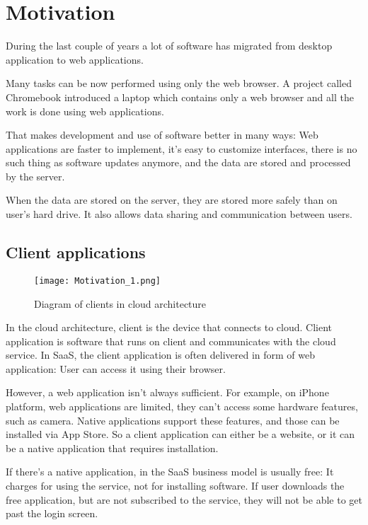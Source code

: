 \section{Motivation}

During the last couple of years a lot of software has migrated from desktop application to web applications.

Many tasks can be now performed using only the web browser. A project called Chromebook \citep{chromebook} introduced a laptop which contains only a web browser and all the work is done using web applications.

That makes development and use of software better in many ways: Web applications are faster to implement, it’s easy to customize interfaces, there is no such thing as software updates anymore, and the data are stored and processed by the server.

When the data are stored on the server, they are stored more safely than on user's hard drive. It also allows data sharing and communication between users.

\subsection{Client applications}

\begin{figure}[ht!]
\centering
\texttt{[image: Motivation\_1.png]}
\caption{Diagram of clients in cloud architecture \label{fig:1}}
\end{figure}

In the cloud architecture, client is the device that connects to cloud. Client application is software that runs on client and communicates with the cloud service. In SaaS, the client application is often delivered in form of web application: User can access it using their browser.

However, a web application isn't always sufficient. For example, on iPhone platform, web applications are limited, they can’t access some hardware features, such as camera. Native applications support these features, and those can be installed via App Store. So a client application can either be a website, or it can be a native application that requires installation.

If there's a native application, in the SaaS business model is usually free: It charges for using the service, not for installing software. If user downloads the free application, but are not subscribed to the service, they will not be able to get past the login screen. 

